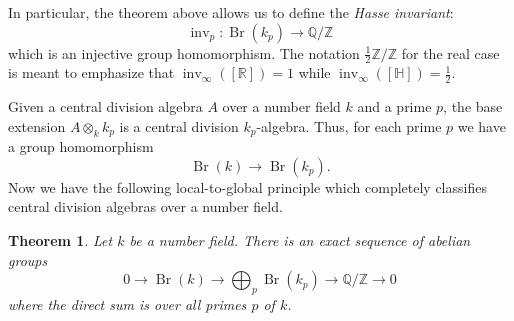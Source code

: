 \documentclass[12pt]{article}
\theoremstyle{plain}
\newtheorem{theorem}{Theorem}[section]
\theoremstyle{definition}
\theoremstyle{remark}
\numberwithin{equation}{section}
\begin{document}
In particular, the theorem above allows us to define the
\emph{Hasse invariant}:
\[
\operatorname{inv}_p : \operatorname{Br}(k_p) \to \mathbb{Q}/\mathbb{Z}
\]
which is an injective group homomorphism.
The notation $\frac{1}{2}\mathbb{Z}/\mathbb{Z}$ for the real case
is meant to emphasize that $\operatorname{inv}_\infty([\mathbb{R}])=1$
while $\operatorname{inv}_\infty([\mathbb{H}])=\frac{1}{2}$.

Given a central division algebra $A$ over a number field $k$
and a prime $p$, the base extension $A \otimes_k k_p$ is
a central division $k_p$-algebra.
Thus, for each prime $p$ we have a group homomorphism
\[
\operatorname{Br}(k) \to \operatorname{Br}(k_p).
\]
Now we have the following local-to-global principle
which completely classifies central division algebras over a number
field.

\begin{theorem}
Let $k$ be a number field.
There is an exact sequence of abelian groups
\[
0 \to \operatorname{Br}(k) \to
\bigoplus_p \operatorname{Br}(k_p) \to \mathbb{Q}/\mathbb{Z} \to 0
\]
where the direct sum is over all primes $p$ of $k$.
\end{theorem}



\end{document}
